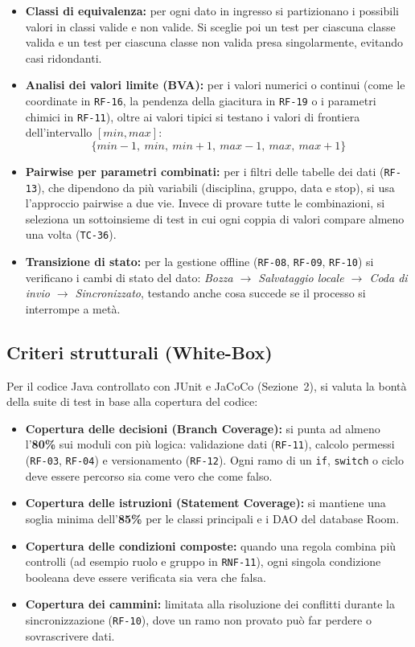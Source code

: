 \begin{itemize}
    \item \textbf{Classi di equivalenza:} per ogni dato in ingresso si partizionano i possibili valori in classi valide e non valide. Si sceglie poi un test per ciascuna classe valida e un test per ciascuna classe non valida presa singolarmente, evitando casi ridondanti.
    \item \textbf{Analisi dei valori limite (BVA):} per i valori numerici o continui (come le coordinate in \texttt{RF-16}, la pendenza della giacitura in \texttt{RF-19} o i parametri chimici in \texttt{RF-11}), oltre ai valori tipici si testano i valori di frontiera dell'intervallo $[min, max]$:
    \[
    \{min-1, \: min, \: min+1, \: max-1, \: max, \: max+1\}
    \]
    \item \textbf{Pairwise per parametri combinati:} per i filtri delle tabelle dei dati (\texttt{RF-13}), che dipendono da più variabili (disciplina, gruppo, data e stop), si usa l'approccio pairwise a due vie. Invece di provare tutte le combinazioni, si seleziona un sottoinsieme di test in cui ogni coppia di valori compare almeno una volta (\texttt{TC-36}).
    \item \textbf{Transizione di stato:} per la gestione offline (\texttt{RF-08}, \texttt{RF-09}, \texttt{RF-10}) si verificano i cambi di stato del dato: \emph{Bozza $\to$ Salvataggio locale $\to$ Coda di invio $\to$ Sincronizzato}, testando anche cosa succede se il processo si interrompe a metà.
\end{itemize}

\subsection{Criteri strutturali (White-Box)}
Per il codice Java controllato con JUnit e JaCoCo (Sezione~2), si valuta la bontà della suite di test in base alla copertura del codice:

\begin{itemize}
    \item \textbf{Copertura delle decisioni (Branch Coverage):} si punta ad almeno l'\textbf{80\%} sui moduli con più logica: validazione dati (\texttt{RF-11}), calcolo permessi (\texttt{RF-03}, \texttt{RF-04}) e versionamento (\texttt{RF-12}). Ogni ramo di un \texttt{if}, \texttt{switch} o ciclo deve essere percorso sia come vero che come falso.
    \item \textbf{Copertura delle istruzioni (Statement Coverage):} si mantiene una soglia minima dell'\textbf{85\%} per le classi principali e i DAO del database Room.
    \item \textbf{Copertura delle condizioni composte:} quando una regola combina più controlli (ad esempio ruolo e gruppo in \texttt{RNF-11}), ogni singola condizione booleana deve essere verificata sia vera che falsa.
    \item \textbf{Copertura dei cammini:} limitata alla risoluzione dei conflitti durante la sincronizzazione (\texttt{RF-10}), dove un ramo non provato può far perdere o sovrascrivere dati.
\end{itemize}

